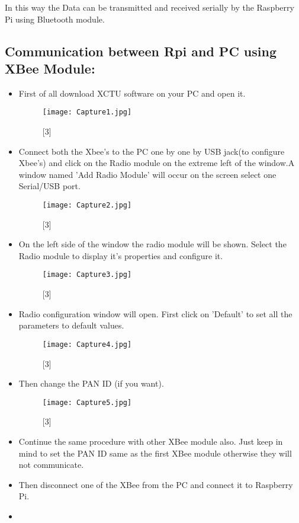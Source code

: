 \documentclass[11pt,a4paper]{article}
\begin{document}
	In this way the Data can be transmitted and received serially by the Raspberry Pi using Bluetooth module.
	
	\subsection{Communication between Rpi and PC using XBee Module:}
	\begin{itemize}
		\item First of all download XCTU software on your PC and open it.
		\begin{figure}[h!]
			\texttt{[image: Capture1.jpg]}
			\centering
			\caption{[3]}
		\end{figure} 
		\item Connect both the Xbee's to the PC one by one by USB jack(to configure Xbee's) and click on the Radio module on the extreme left of the window.A window named 'Add Radio Module' will occur on the screen select one Serial/USB port.
		\begin{figure}[h!]
			\texttt{[image: Capture2.jpg]}
			\centering
			\caption{[3]}
		\end{figure} 
		\item On the left side of the window the radio module will be shown. Select the Radio module to display it's properties and configure it.
		\begin{figure}[h!]
			\texttt{[image: Capture3.jpg]}
			\centering
			\caption{[3]}
		\end{figure} 
		\item Radio configuration window will open. First click on 'Default' to set all the parameters to default values.
		\begin{figure}[h!]
			\texttt{[image: Capture4.jpg]}
			\centering
			\caption{[3]}
		\end{figure} 
		\item Then change the PAN ID (if you want).
		\begin{figure}[h!]
			\texttt{[image: Capture5.jpg]}
			\centering
			\caption{[3]}
		\end{figure}  
		\newpage
		\item Continue the same procedure with other XBee module also. Just keep in mind to set the PAN ID same as the first XBee module otherwise they will not communicate.
		\item Then disconnect one of the XBee from the PC and connect it to Raspberry Pi.
	\item 

\end{itemize}
\end{document}
